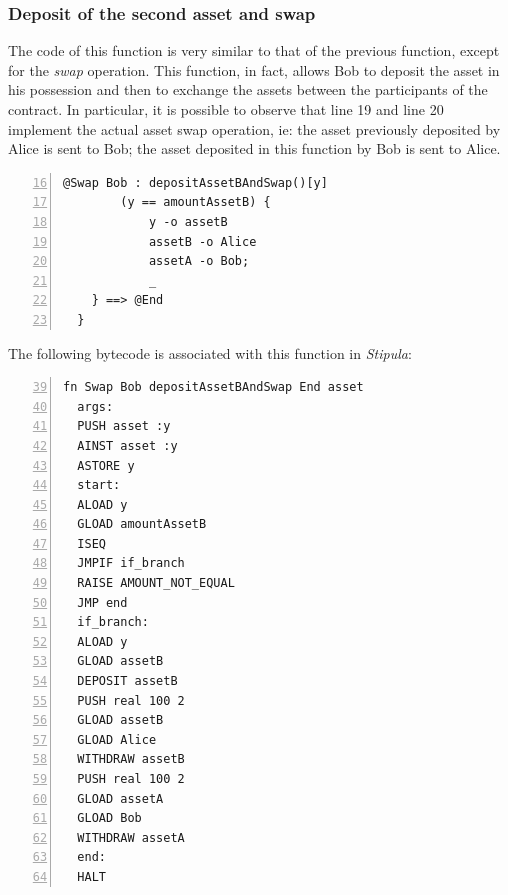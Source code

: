 \subsubsection{Deposit of the second asset and swap}

The code of this function is very similar to that of the previous function, except for the \textit{swap} 
operation. This function, in fact, allows Bob to deposit the asset in his possession and then to exchange 
the assets between the participants of the contract. In particular, it is possible to observe that line 19 
and line 20 implement the actual asset swap operation, ie: the asset previously deposited by Alice is sent 
to Bob; the asset deposited in this function by Bob is sent to Alice.

\begin{Verbatim}[numbers=left,xleftmargin=1cm,firstnumber=16,tabsize=2]
  @Swap Bob : depositAssetBAndSwap()[y]
        (y == amountAssetB) {
            y -o assetB
            assetB -o Alice
            assetA -o Bob;
            _
    } ==> @End
  }
\end{Verbatim}

The following bytecode is associated with this function in \textit{Stipula}:
\begin{Verbatim}[numbers=left,xleftmargin=1cm,firstnumber=39,tabsize=2]
  fn Swap Bob depositAssetBAndSwap End asset
  args:
  PUSH asset :y
  AINST asset :y
  ASTORE y
  start:
  ALOAD y
  GLOAD amountAssetB
  ISEQ
  JMPIF if_branch
  RAISE AMOUNT_NOT_EQUAL
  JMP end
  if_branch:
  ALOAD y
  GLOAD assetB
  DEPOSIT assetB
  PUSH real 100 2
  GLOAD assetB
  GLOAD Alice
  WITHDRAW assetB
  PUSH real 100 2
  GLOAD assetA
  GLOAD Bob
  WITHDRAW assetA
  end:
  HALT
\end{Verbatim}

